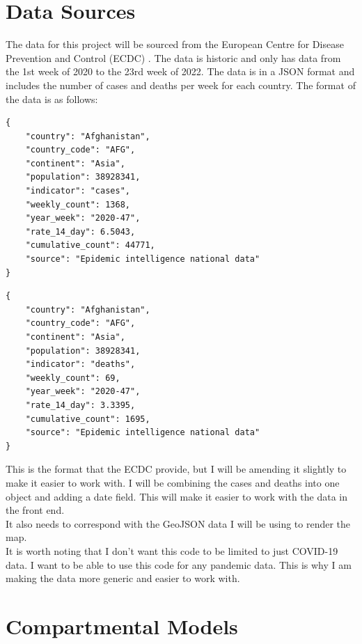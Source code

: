 \documentclass{report}
\begin{document}
\section{Data Sources}
The data for this project will be sourced from the European Centre for Disease Prevention and Control (ECDC) \cite{ecdc}. The data is historic and only has data from the 1st week of 2020 to the 23rd week of 2022. The data is in a JSON format and includes the number of cases and deaths per week for each country. The format of the data is as follows:

\begin{minipage}{0.45\textwidth}
\begin{lstlisting}[caption={Cases JSON Example}]
{
    "country": "Afghanistan",
    "country_code": "AFG",
    "continent": "Asia",
    "population": 38928341,
    "indicator": "cases",
    "weekly_count": 1368,
    "year_week": "2020-47",
    "rate_14_day": 6.5043,
    "cumulative_count": 44771,
    "source": "Epidemic intelligence national data"
}
\end{lstlisting}
\end{minipage}
\hfill
\begin{minipage}{0.45\textwidth}
\begin{lstlisting}[caption={Deaths JSON Example}]
{
    "country": "Afghanistan",
    "country_code": "AFG",
    "continent": "Asia",
    "population": 38928341,
    "indicator": "deaths",
    "weekly_count": 69,
    "year_week": "2020-47",
    "rate_14_day": 3.3395,
    "cumulative_count": 1695,
    "source": "Epidemic intelligence national data"
}
\end{lstlisting}
\end{minipage}

This is the format that the ECDC provide, but I will be amending it slightly to make it easier to work with. I will be combining the cases and deaths into one object and adding a date field. This will make it easier to work with the data in the front end.\\

It also needs to correspond with the GeoJSON data I will be using to render the map. \\

It is worth noting that I don't want this code to be limited to just COVID-19 data. I want to be able to use this code for any pandemic data. This is why I am making the data more generic and easier to work with.
\newpage
\section{Compartmental Models}
\end{document}
